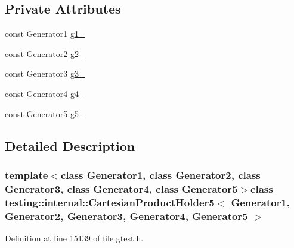 \subsection*{\-Private \-Attributes}
\begin{DoxyCompactItemize}
\item 
const \-Generator1 \hyperlink{classtesting_1_1internal_1_1CartesianProductHolder5_a36a04c8f9e515291d6a093ab378084f7}{g1\-\_\-}
\item 
const \-Generator2 \hyperlink{classtesting_1_1internal_1_1CartesianProductHolder5_a6cfd9fa9a396d07747d5ebb1f05c7f22}{g2\-\_\-}
\item 
const \-Generator3 \hyperlink{classtesting_1_1internal_1_1CartesianProductHolder5_a79088ad1a5d8e0e316bd20057b9cfb3f}{g3\-\_\-}
\item 
const \-Generator4 \hyperlink{classtesting_1_1internal_1_1CartesianProductHolder5_afdb77af6126bc058715b1304ec0cc727}{g4\-\_\-}
\item 
const \-Generator5 \hyperlink{classtesting_1_1internal_1_1CartesianProductHolder5_ac153ca256cc6aabca132e9276e0b7e80}{g5\-\_\-}
\end{DoxyCompactItemize}


\subsection{\-Detailed \-Description}
\subsubsection*{template$<$class Generator1, class Generator2, class Generator3, class Generator4, class Generator5$>$class testing\-::internal\-::\-Cartesian\-Product\-Holder5$<$ Generator1, Generator2, Generator3, Generator4, Generator5 $>$}



\-Definition at line 15139 of file gtest.\-h.



